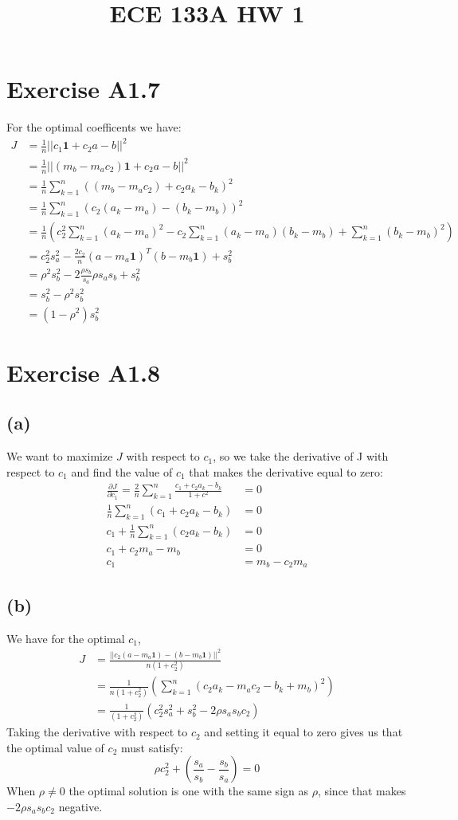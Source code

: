 
\title{ECE 133A HW 1}

\maketitle
\section*{Exercise A1.7}
For the optimal coefficents we have:
\begin{align*}
    J&=\frac{1}{n}||c_1\textbf{1}+c_2a-b||^2\\
    &=\frac{1}{n}||(m_b-m_ac_2)\textbf{1}+c_2a-b||^2\\
    &=\frac{1}{n}\sum_{k=1}^n((m_b-m_ac_2)+c_2a_k-b_k)^2\\
    &=\frac{1}{n}\sum_{k=1}^n(c_2(a_k-m_a)-(b_k-m_b))^2\\
    &=\frac{1}{n}\left(c_2^2\sum_{k=1}^n(a_k-m_a)^2-c_2\sum_{k=1}^n(a_k-m_a)(b_k-m_b) +\sum_{k=1}^n(b_k-m_b)^2\right)\\
    &=c_2^2s_a^2-\frac{2c_2}{n}(a-m_a\textbf{1})^T(b-m_b\textbf{1})+s_b^2\\
    &=\rho^2s_b^2-2\frac{\rho s_b}{s_a}\rho s_a s_b+s_b^2\\
    &=s_b^2-\rho^2 s_b^2\\
    &=\boxed{(1-\rho^2)s_b^2}
\end{align*}
\section*{Exercise A1.8}
\subsection*{(a)}
We want to maximize $J$ with respect to $c_1$, so we take the derivative of J with respect to $c_1$ and find
the value of $c_1$ that makes the derivative equal to zero:
\begin{align*}
\frac{\partial J}{\partial c_1}=\frac{2}{n}\sum_{k=1}^n\frac{c_1+c_2a_k-b_k}{1+c^2}&=0\\ 
\frac{1}{n}\sum_{k=1}^n(c_1+c_2a_k-b_k)&=0\\
c_1+\frac{1}{n}\sum_{k=1}^n(c_2a_k-b_k)&=0\\
c_1+c_2m_a-m_b&=0\\
c_1&=m_b-c_2m_a
\end{align*}
\subsection*{(b)}
We have for the optimal $c_1$, 
\begin{align*}
    J&=\frac{||c_2(a-m_a\textbf{1})-(b-m_b\textbf{1})||^2}{n(1+c_2^2)}\\
    &=\frac{1}{n(1+c_2^2)}\left(\sum_{k=1}^n(c_2a_k-m_ac_2-b_k+m_b)^2\right)\\
    &=\frac{1}{(1+c_2^2)}\left(c_2^2s_a^2+s_b^2-2\rho s_a s_b c_2\right)
\end{align*}
Taking the derivative with respect to $c_2$ and setting it equal to zero gives us that the optimal value of 
$c_2$ must satisfy:
$$\rho c_2^2+\left(\frac{s_a}{s_b}-\frac{s_b}{s_a}\right)=0$$
When $\rho\neq0$ the optimal solution is one with the same sign as 
$\rho$, since that makes $-2\rho s_a s_b c_2$ negative.
